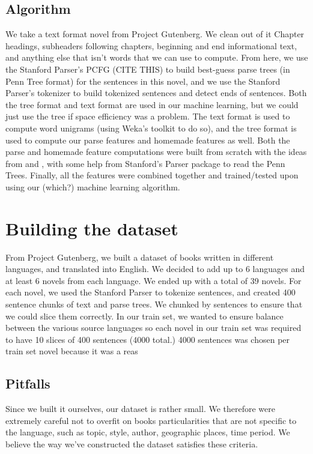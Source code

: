 \documentclass[10pt]{article}
\begin{document}
\subsection{Algorithm}
We take a text format novel from Project Gutenberg. We clean out of it Chapter headings, subheaders following chapters, beginning and end informational text, and anything else that isn't words that we can use to compute. From here, we use the Stanford Parser's PCFG (CITE THIS) to build best-guess parse trees (in Penn Tree format) for the sentences in this novel, and we use the Stanford Parser's tokenizer to build tokenized sentences and detect ends of sentences. Both the tree format and text format are used in our machine learning, but we could just use the tree if space efficiency was a problem. The text format is used to compute word unigrams (using Weka's toolkit to do so), and the tree format is used to compute our parse features and homemade features as well. Both the parse and homemade feature computations were built from scratch with the ideas from  \cite{homemade} and  \cite{Parse}, with some help from Stanford's Parser package to read the Penn Trees. Finally, all the features were combined together and trained/tested upon using our (which?) machine learning algorithm.



\section{Building the dataset}
From Project Gutenberg, we built a dataset of books written in different languages, and translated into English. We decided to add up to 6 languages and at least 6 novels from each language. We ended up with a total of 39 novels. For each novel, we used the Stanford Parser to tokenize sentences, and created 400 sentence chunks of text and parse trees. We chunked by sentences to ensure that we could slice them correctly. In our train set, we wanted to ensure balance between the various source languages so each novel in our train set was required to have 10 slices of 400 sentences (4000 total.) 4000 sentences was chosen per train set novel because it was a reas
\subsection{Pitfalls}
Since we built it ourselves, our dataset is rather small. We therefore were extremely careful not to overfit on books particularities that are not specific to the language, such as topic, style, author, geographic places, time period. We believe the way we've constructed the dataset satisfies these criteria. 
\end{document}
